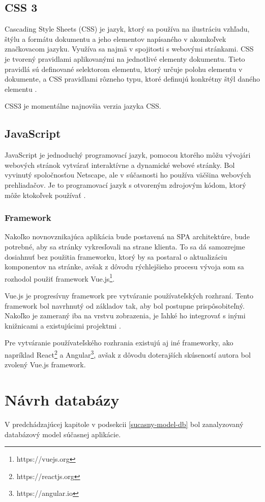 \subsection{CSS 3}
Cascading Style Sheets (CSS) je jazyk, ktorý sa používa na ilustráciu vzhľadu, štýlu a formátu dokumentu a jeho elementov napísaného v akomkoľvek značkovacom jazyku. Využíva sa najmä v spojitosti s webovými stránkami. CSS je tvorený pravidlami aplikovanými na jednotlivé elementy dokumentu. Tieto pravidlá sú definované selektorom elementu, ktorý určuje polohu elementu v dokumente, a CSS pravidlami rôzneho typu, ktoré definujú konkrétny štýl daného elementu \cite{co-je-css}. 

CSS3 je momentálne najnovšia verzia jazyka CSS.

\subsection{JavaScript}
JavaScript je jednoduchý programovací jazyk, pomocou ktorého môžu vývojári webových stránok vytvárať interaktívne a dynamické webové stránky. Bol vyvinutý spoločnosťou Netscape, ale v súčasnosti ho používa väčšina webových prehliadačov. Je to programovací jazyk s otvoreným zdrojovým kódom, ktorý môže ktokoľvek používať \cite{co-je-js}.

\subsubsection*{Framework}
Nakoľko novnovznikajúca aplikácia bude postavená na SPA architektúre, bude potrebné, aby sa stránky vykresľovali na strane klienta. To sa dá samozrejme dosiahnuť bez použitia frameworku, ktorý by sa postaral o aktualizáciu komponentov na stránke, avšak z dôvodu rýchlejšieho procesu vývoja som sa rozhodol použiť framework Vue.js\footnote{https://vuejs.org}.

Vue.js je progresívny framework pre vytváranie používateľských rozhraní. Tento framework bol navrhnutý od základov tak, aby bol postupne prispôsobiteľný. Nakoľko je zameraný iba na vrstvu zobrazenia, je ľahké ho integrovať s inými knižnicami a existujúcimi projektmi \cite{co-je-vue}.

Pre vytváranie používateľského rozhrania existujú aj iné frameworky, ako napríklad React\footnote{https://reactjs.org} a Angular\footnote{https://angular.io}, avšak z dôvodu doterajších skúseností autora bol zvolený Vue.js framework.

\section{Návrh databázy}
V predchádzajúcej kapitole v podsekcii \ref{sucasny-model-db} bol zanalyzovaný databázový model súčasnej aplikácie.

